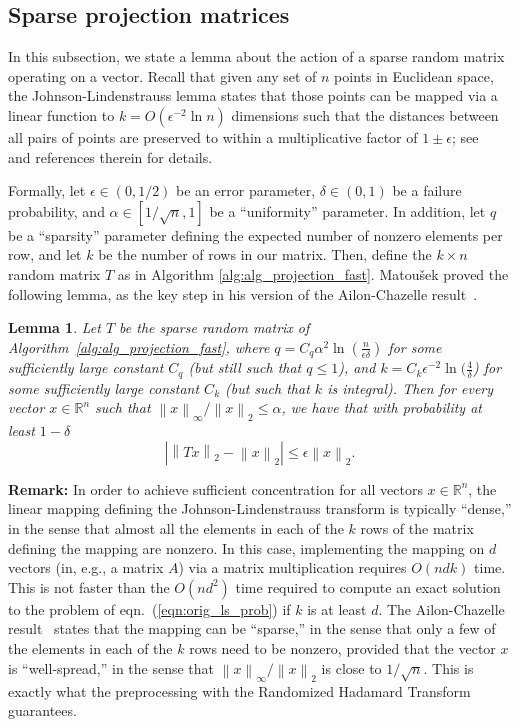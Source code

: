 \documentclass[11pt]{article}
\newcommand{\VTTNorm }[1]{\mbox{}\left\|#1\right\|_2  }
\newcommand{\VINorm }[1]{\mbox{}\left\|#1\right\|_{\infty}  }
\newcommand{\abs }[1]{\left|#1\right|}
\newtheorem{lemma}{Lemma}
\begin{document}
\subsection{Sparse projection matrices}
\label{sxn:review_previous:projecting}

In this subsection, we state a lemma about the action of a sparse random matrix operating on a vector. Recall that given any set of $n$ points in Euclidean space, the Johnson-Lindenstrauss lemma states that those points can be mapped via a linear function to $k=O(\epsilon^{-2}\ln n)$ dimensions such that the distances between all pairs of points are preserved to within a multiplicative factor of $1 \pm \epsilon$; see~\cite{Matousek08_RSA} and references therein for details.

Formally, let $\epsilon \in (0,1/2)$ be an error parameter, $\delta \in (0,1)$ be a failure probability, and $\alpha \in [1/\sqrt{n},1]$ be a ``uniformity'' parameter. In addition, let $q$ be a ``sparsity'' parameter defining the expected number of nonzero elements per row, and let $k$ be the number of rows in our matrix. Then, define the $k \times n$ random matrix $T$ as in Algorithm
\ref{alg:alg_projection_fast}. Matou\v{s}ek proved the following lemma, as the key step in his version of the Ailon-Chazelle result~\cite{AC06,Matousek08_RSA}.

\begin{lemma}\label{lem:matousek}
Let $T$ be the sparse random matrix of Algorithm~\ref{alg:alg_projection_fast}, where $q = C_q \alpha^2\ln(\frac{n}{\epsilon\delta})$ for some sufficiently large constant $C_q$ (but still such that $q \le 1$), and $k = C_k \epsilon^{-2} \ln(\frac{4}{\delta}$) for some sufficiently large constant $C_k$ (but such that $k$ is integral). Then for every vector $x \in \mathbb{R}^{n}$ such that $\VINorm{x}/\VTTNorm{x} \le \alpha$, we have that with probability at least $1-\delta$
$$
\abs{\VTTNorm{Tx}-\VTTNorm{x}} \le \epsilon \VTTNorm{x}.
$$
\end{lemma}

\noindent \textbf{Remark:} In order to achieve sufficient concentration for all vectors $x \in \mathbb{R}^{n}$, the linear mapping defining the Johnson-Lindenstrauss transform is typically
``dense,'' in the sense that almost all the elements in each of the $k$ rows of the matrix defining the mapping are nonzero. In this case, implementing the mapping on $d$ vectors (in, e.g., a matrix $A$) via a matrix multiplication requires $O(ndk)$ time. This is not faster than the $O(nd^2)$ time required to compute an exact solution to the problem of eqn.~(\ref{eqn:orig_ls_prob}) if $k$ is at least $d$. The Ailon-Chazelle result~\cite{AC06,Matousek08_RSA} states that the mapping can be ``sparse,'' in the sense that only a few of the elements in each of the $k$ rows need to be nonzero, provided that the vector $x$ is ``well-spread,'' in the sense that $\VINorm{x}/\VTTNorm{x}$ is close to $1/\sqrt{n}$. This is exactly what the preprocessing with the Randomized Hadamard Transform guarantees.
\end{document}
